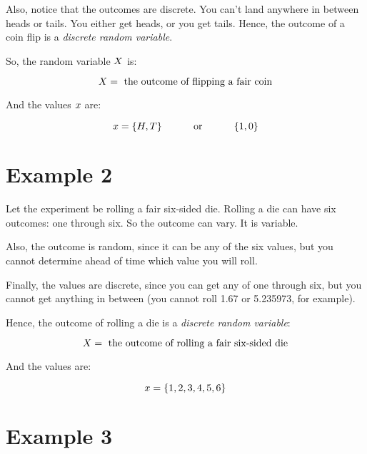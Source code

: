 \documentclass[../../../main.tex]{subfiles}
\begin{document}
Also, notice that the outcomes are discrete. You can't land anywhere in between heads or tails.
You either get heads, or you get tails. Hence, the outcome of a coin flip is a \emph{discrete random variable}.

So, the random variable $\RandVar/$ is:

\begin{equation*}
    \RandVar/ = \text{ the outcome of flipping a fair coin}
\end{equation*}

\noindent
And the values $\RandVarVal/$ are:

\begin{equation*}
    \RandVarVal/ = \{ H, T \} \hskip 1cm \text{ or } \hskip 1cm \{ 1, 0 \}
\end{equation*}


\section{Example 2}

Let the experiment be rolling a fair six-sided die. Rolling a die can have six outcomes: one through six. So the outcome can vary. It is variable.

Also, the outcome is random, since it can be any of the six values, but you cannot determine ahead of time which value you will roll.

Finally, the values are discrete, since you can get any of one through six, but you cannot get anything in between (you cannot roll 1.67 or 5.235973, for example).

Hence, the outcome of rolling a die is a \emph{discrete random variable}:

\begin{equation*}
    \RandVar/ = \text{ the outcome of rolling a fair six-sided die}
\end{equation*}

\noindent
And the values are:

\begin{equation*}
    \RandVarVal/ = \{ 1, 2, 3, 4, 5, 6 \}
\end{equation*}


\section{Example 3}
\end{document}
